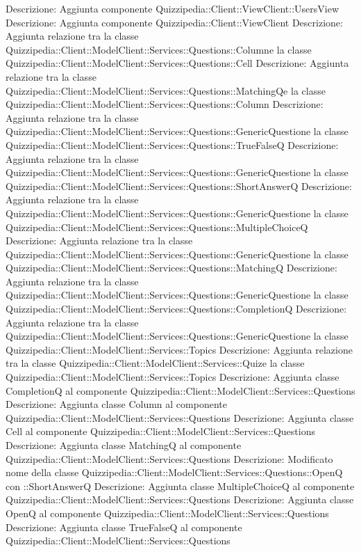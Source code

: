 Descrizione: Aggiunta componente Quizzipedia::Client::ViewClient::UsersView 
Descrizione: Aggiunta componente Quizzipedia::Client::ViewClient 
Descrizione: Aggiunta relazione tra la classe Quizzipedia::Client::ModelClient::Services::Questions::Columne la classe Quizzipedia::Client::ModelClient::Services::Questions::Cell 
Descrizione: Aggiunta relazione tra la classe Quizzipedia::Client::ModelClient::Services::Questions::MatchingQe la classe Quizzipedia::Client::ModelClient::Services::Questions::Column 
Descrizione: Aggiunta relazione tra la classe Quizzipedia::Client::ModelClient::Services::Questions::GenericQuestione la classe Quizzipedia::Client::ModelClient::Services::Questions::TrueFalseQ 
Descrizione: Aggiunta relazione tra la classe Quizzipedia::Client::ModelClient::Services::Questions::GenericQuestione la classe Quizzipedia::Client::ModelClient::Services::Questions::ShortAnswerQ 
Descrizione: Aggiunta relazione tra la classe Quizzipedia::Client::ModelClient::Services::Questions::GenericQuestione la classe Quizzipedia::Client::ModelClient::Services::Questions::MultipleChoiceQ 
Descrizione: Aggiunta relazione tra la classe Quizzipedia::Client::ModelClient::Services::Questions::GenericQuestione la classe Quizzipedia::Client::ModelClient::Services::Questions::MatchingQ 
Descrizione: Aggiunta relazione tra la classe Quizzipedia::Client::ModelClient::Services::Questions::GenericQuestione la classe Quizzipedia::Client::ModelClient::Services::Questions::CompletionQ 
Descrizione: Aggiunta relazione tra la classe Quizzipedia::Client::ModelClient::Services::Questions::GenericQuestione la classe Quizzipedia::Client::ModelClient::Services::Topics 
Descrizione: Aggiunta relazione tra la classe Quizzipedia::Client::ModelClient::Services::Quize la classe Quizzipedia::Client::ModelClient::Services::Topics 
Descrizione: Aggiunta classe CompletionQ al componente Quizzipedia::Client::ModelClient::Services::Questions 
Descrizione: Aggiunta classe Column al componente Quizzipedia::Client::ModelClient::Services::Questions 
Descrizione: Aggiunta classe Cell al componente Quizzipedia::Client::ModelClient::Services::Questions 
Descrizione: Aggiunta classe MatchingQ al componente Quizzipedia::Client::ModelClient::Services::Questions 
Descrizione: Modificato nome della classe Quizzipedia::Client::ModelClient::Services::Questions::OpenQ con ::ShortAnswerQ 
Descrizione: Aggiunta classe MultipleChoiceQ al componente Quizzipedia::Client::ModelClient::Services::Questions 
Descrizione: Aggiunta classe OpenQ al componente Quizzipedia::Client::ModelClient::Services::Questions 
Descrizione: Aggiunta classe TrueFalseQ al componente Quizzipedia::Client::ModelClient::Services::Questions 
